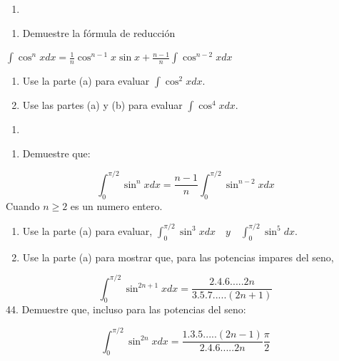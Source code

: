 \documentclass[12pt,]{article}
\providecommand{\tightlist}{%
  \setlength{\itemsep}{0pt}\setlength{\parskip}{0pt}}
\begin{document}
\begin{enumerate}
\def\labelenumi{\arabic{enumi}.}
\setcounter{enumi}{41}
\item
\end{enumerate}

\begin{enumerate}
\def\labelenumi{\alph{enumi}.}
\tightlist
\item
  Demuestre la fórmula de reducción
\end{enumerate}

\(\displaystyle\int\cos^nxdx=\frac{1}{n}\cos^{n-1}x\sin x+\frac{n-1}{n}\displaystyle\int \cos^{n-2}xdx\)

\begin{enumerate}
\def\labelenumi{\alph{enumi}.}
\setcounter{enumi}{1}
\item
  Use la parte (a) para evaluar \(\displaystyle\int\cos^2xdx.\)
\item
  Use las partes (a) y (b) para evaluar \(\displaystyle\int\cos^4xdx.\)
\end{enumerate}

\begin{enumerate}
\def\labelenumi{\arabic{enumi}.}
\setcounter{enumi}{42}
\item
\end{enumerate}

\begin{enumerate}
\def\labelenumi{\alph{enumi}.}
\tightlist
\item
  Demuestre que:
\end{enumerate}

\[\displaystyle\int_0^{\pi/2}\sin^nxdx=\frac{n-1}{n}\displaystyle\int_0^{\pi/2}\sin^{n-2}xdx\]
Cuando \(n\ge2\) es un numero entero.

\begin{enumerate}
\def\labelenumi{\alph{enumi}.}
\setcounter{enumi}{1}
\item
  Use la parte (a) para evaluar,
  \(\displaystyle\int_0^{\pi/2}\sin^3x dx\quad y\quad \displaystyle\int_0^{\pi/2}\sin^5dx.\)
\item
  Use la parte (a) para mostrar que, para las potencias impares del
  seno,
\end{enumerate}

\[\displaystyle\int_0^{\pi/2}\sin^{2n+1}xdx=\frac{2.4.6.....2n}{3.5.7.....(2n+1)}\]
44. Demuestre que, incluso para las potencias del seno:

\[\displaystyle\int_0^{\pi/2}\sin^{2n}xdx=\frac{1.3.5.....(2n-1)}{2.4.6.....2n}\frac{\pi}{2}\]
\end{document}
